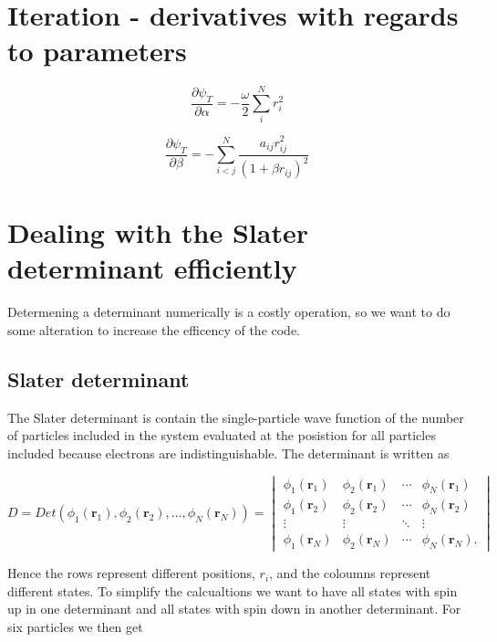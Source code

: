 \section{Iteration - derivatives with regards to parameters}

\begin{equation}
\frac{\partial \psi_T}{\partial \alpha} = -\frac{\omega}{2}\sum_i^N r_i^2
\end{equation}

\begin{equation}
\frac{\partial \psi_T}{\partial \beta} = - \sum_{i<j}^N \frac{a_{ij}r_{ij}^2}{(1+\beta r_{ij})^2}
\end{equation}

\section{Dealing with the Slater determinant efficiently}

Determening a determinant numerically is a costly operation, so we want to do some alteration to increase the efficency of the code.

\subsection{Slater determinant}

The Slater determinant is contain the single-particle wave function of the number of particles included in the system evaluated at the posistion for all particles included because electrons are indistinguishable. The determinant is written as

$$ D = Det\left(\phi_{1}(\bm{r}_1),\phi_{2}(\bm{r}_2),
   \dots,\phi_{N}(\bm{r}_N)\right) =  \begin{vmatrix}
  \phi_{1}(\bm{r}_1) & \phi_{2}(\bm{r}_1) & \cdots & \phi_{N}(\bm{r}_1) \\
  \phi_{1}(\bm{r}_2) & \phi_{2}(\bm{r}_2) & \cdots & \phi_{N}(\bm{r}_2) \\
  \vdots  & \vdots  & \ddots & \vdots  \\
  \phi_{1}(\bm{r}_N) & \phi_{2}(\bm{r}_N) & \cdots & \phi_{N}(\bm{r}_N).
\end{vmatrix}$$

Hence the rows represent different positions, $r_i$, and the coloumns represent different states. To simplify the calcualtions we want to have all states with spin up in one determinant and all states with spin down in another determinant. For six particles we then get

